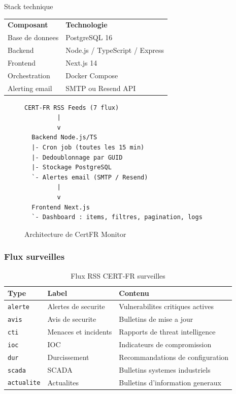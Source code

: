 \documentclass{rapport}
\begin{document}
\begin{boitetech}{Stack technique}
\begin{tabular}{ll}
\textbf{Composant} & \textbf{Technologie} \\
Base de donnees    & PostgreSQL 16 \\
Backend            & Node.js / TypeScript / Express \\
Frontend           & Next.js 14 \\
Orchestration      & Docker Compose \\
Alerting email     & SMTP ou Resend API \\
\end{tabular}
\end{boitetech}

\begin{figure}[H]
\centering
\begin{verbatim}
CERT-FR RSS Feeds (7 flux)
         |
         v
  Backend Node.js/TS
  |- Cron job (toutes les 15 min)
  |- Dedoublonnage par GUID
  |- Stockage PostgreSQL
  `- Alertes email (SMTP / Resend)
         |
         v
  Frontend Next.js
  `- Dashboard : items, filtres, pagination, logs
\end{verbatim}
\caption{Architecture de CertFR Monitor}
\end{figure}

\subsubsection{Flux surveilles}

\begin{table}[H]
\centering
\begin{tabular}{llp{7cm}}
\toprule
\textbf{Type} & \textbf{Label} & \textbf{Contenu} \\
\midrule
\texttt{alerte}    & Alertes de securite  & Vulnerabilites critiques actives \\
\texttt{avis}      & Avis de securite     & Bulletins de mise a jour \\
\texttt{cti}       & Menaces et incidents & Rapports de threat intelligence \\
\texttt{ioc}       & IOC                  & Indicateurs de compromission \\
\texttt{dur}       & Durcissement         & Recommandations de configuration \\
\texttt{scada}     & SCADA                & Bulletins systemes industriels \\
\texttt{actualite} & Actualites           & Bulletins d'information generaux \\
\bottomrule
\end{tabular}
\caption{Flux RSS CERT-FR surveilles}
\end{table}
\end{document}
